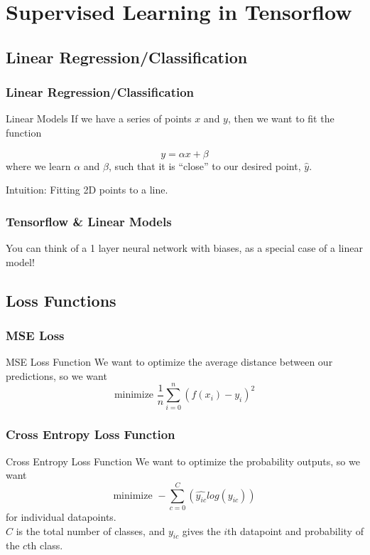 \documentclass{beamer}
\begin{document}
\section{Supervised Learning in Tensorflow}
\subsection{Linear Regression/Classification}


\begin{frame}
  \frametitle{Linear Regression/Classification}
  \begin{block}{Linear Models}
    If we have a series of points $x$ and $y$, then we want to fit the function

    $$y = \alpha x + \beta$$
    where we learn $\alpha$ and $\beta$, such that it is ``close'' to our desired point, $\hat{y}$.

    Intuition: Fitting 2D points to a line.
  \end{block}
\end{frame}

\begin{frame}
  \frametitle{Tensorflow \& Linear Models}
  You can think of a 1 layer neural network with biases, as a special case of a linear model!
\end{frame}

\subsection{Loss Functions}
\begin{frame}
  \frametitle{MSE Loss}
  \begin{block}{MSE Loss Function}
    We want to optimize the average distance between our predictions, so we want \\
    $$\text{minimize } \frac{1}{n}\sum_{i=0}^{n}(f(x_i) - y_i)^2$$
  \end{block}
\end{frame}

\begin{frame}
  \frametitle{Cross Entropy Loss Function}
  \begin{block}{Cross Entropy Loss Function}
    We want to optimize the probability outputs, so we want \\
    $$\text{minimize } -\sum_{c=0}^C(\hat{y_{ic}}log(y_{ic}))$$
    for individual datapoints. \\
    $C$ is the total number of classes, and $y_{ic}$ gives the $i$th datapoint and probability of the $c$th class.
  \end{block}
\end{frame}
\end{document}
